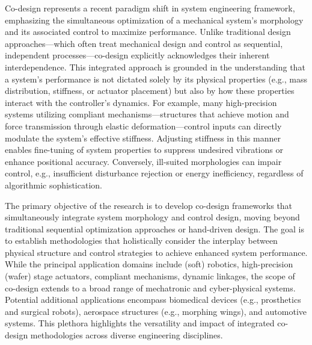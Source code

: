 \documentclass[12pt]{article}
\begin{document}
\hspace{5mm} Co-design represents a recent paradigm shift in system engineering framework, emphasizing the simultaneous optimization of a mechanical system’s morphology and its associated control to maximize performance. Unlike traditional design approaches—which often treat mechanical design and control as sequential, independent processes—co-design explicitly acknowledges their inherent interdependence. This integrated approach is grounded in the understanding that a system’s performance is not dictated solely by its physical properties (e.g., mass distribution, stiffness, or actuator placement) but also by how these properties interact with the controller’s dynamics. For example, many high-precision systems utilizing compliant mechanisms—structures that achieve motion and force transmission through elastic deformation—control inputs can directly modulate the system’s effective stiffness. Adjusting stiffness in this manner enables fine-tuning of system properties to suppress undesired vibrations or enhance positional accuracy. Conversely, ill-suited morphologies can impair control, e.g., insufficient disturbance rejection or energy inefficiency, regardless of algorithmic sophistication.

The primary objective of the research is to develop co-design frameworks that simultaneously integrate system morphology and control design, moving beyond traditional sequential optimization approaches or hand-driven design. The goal is to establish methodologies that holistically consider the interplay between physical structure and control strategies to achieve enhanced system performance.
While the principal application domains include (soft) robotics, high-precision (wafer) stage actuators, compliant mechanisms, dynamic linkages, the scope of co-design extends to a broad range of mechatronic and cyber-physical systems. Potential additional applications encompass biomedical devices (e.g., prosthetics and surgical robots), aerospace structures (e.g., morphing wings), and automotive systems. This plethora highlights the versatility and impact of integrated co-design methodologies across diverse engineering disciplines. 


\end{document}
